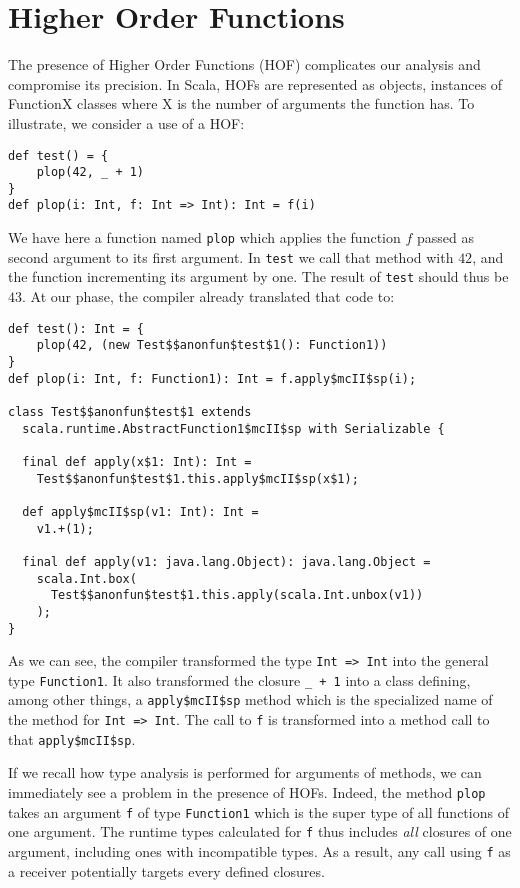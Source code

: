 \section{Higher Order Functions}
The presence of Higher Order Functions (HOF) complicates our analysis and
compromise its precision. In Scala, HOFs are represented as objects, instances
of FunctionX classes where X is the number of arguments the function has. To
illustrate, we consider a use of a HOF:
\begin{lstlisting}
def test() = {
    plop(42, _ + 1)
}
def plop(i: Int, f: Int => Int): Int = f(i)
\end{lstlisting}
We have here a function named \lstinline{plop} which applies the function $f$ passed
as second argument to its first argument. In \lstinline{test} we call that method
with $42$, and the function incrementing its argument by one. The result of
\lstinline{test} should thus be $43$. At our phase, the compiler already
translated that code to:
\begin{lstlisting}
def test(): Int = {
    plop(42, (new Test$$anonfun$test$1(): Function1))
}
def plop(i: Int, f: Function1): Int = f.apply$mcII$sp(i);

class Test$$anonfun$test$1 extends
  scala.runtime.AbstractFunction1$mcII$sp with Serializable {

  final def apply(x$1: Int): Int =
    Test$$anonfun$test$1.this.apply$mcII$sp(x$1);

  def apply$mcII$sp(v1: Int): Int =
    v1.+(1);

  final def apply(v1: java.lang.Object): java.lang.Object =
    scala.Int.box(
      Test$$anonfun$test$1.this.apply(scala.Int.unbox(v1))
    );
}

\end{lstlisting}
As we can see, the compiler transformed the type \lstinline{Int => Int} into
the general type \lstinline{Function1}. It also transformed the closure
\lstinline{_ + 1} into a class defining, among other things, a
\lstinline{apply$mcII$sp} method which is the specialized name of the method
for \lstinline{Int => Int}. The call to \lstinline{f} is transformed into a
method call to that \lstinline{apply$mcII$sp}.

If we recall how type analysis is performed for arguments of methods, we can
immediately see a problem in the presence of HOFs. Indeed, the method
\lstinline{plop} takes an argument \lstinline{f} of type \lstinline{Function1}
which is the super type of all functions of one argument. The runtime types
calculated for \lstinline{f} thus includes \emph{all} closures of one argument,
including ones with incompatible types. As a result, any call using
\lstinline{f} as a receiver potentially targets every defined closures.

